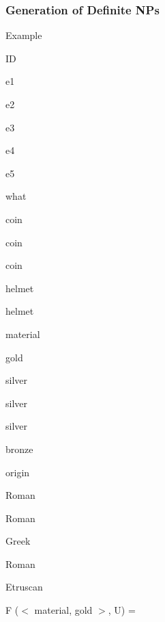 \documentclass[compress,color=usenames]{beamer}
\begin{document}
\begin{frame}
\frametitle{
Generation of Deﬁnite NPs}



Example



ID



e1



e2



e3



e4



e5






what



coin



coin



coin



helmet



helmet






material



gold



silver



silver



silver



bronze






origin



Roman



Roman



Greek



Roman



Etruscan






F ($<$ material, gold $>$, U) =




\end{frame}
\end{document}
